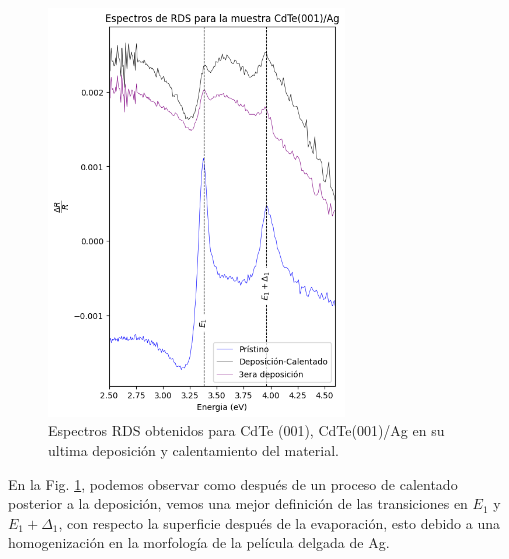 \begin{figure}[H]
    \centering
    \includegraphics[width=0.7\textwidth]{figures/chap4/cdte-ag/rds-results/output-rds2.png}
        \caption{Espectros RDS obtenidos para CdTe (001), CdTe(001)/Ag en su ultima deposición y calentamiento del material.}
    \label{fig:cdte-rds-2}
\end{figure}

En la Fig. \ref{fig:cdte-rds-2}, podemos observar como después de un proceso de calentado posterior a la deposición, vemos una mejor definición de las transiciones en $E_{1}$ y $E_{1}+\Delta_{1}$, con respecto la superficie después de la evaporación, esto debido a una homogenización en la morfología de la película delgada de Ag.

